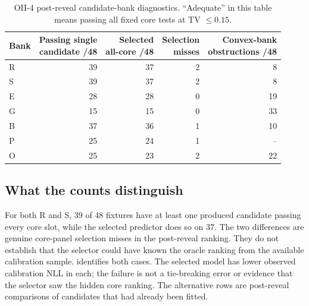 \begin{table}[tbp]
\centering
\caption{OII-4 post-reveal candidate-bank diagnostics. ``Adequate'' in this table means passing all fixed core tests at TV $\leq0.15$.}\label{tab:banks}
\small
\setlength{\tabcolsep}{5pt}
\begin{tabular}{lrrrr}
\toprule
Bank & \shortstack{Passing single\\candidate /48} & \shortstack{Selected\\all-core /48} & \shortstack{Selection\\misses} & \shortstack{Convex-bank\\obstructions /48} \\
\midrule
R & 39 & 37 & 2 & 8 \\
S & 39 & 37 & 2 & 8 \\
E & 28 & 28 & 0 & 19 \\
G & 15 & 15 & 0 & 33 \\
B & 37 & 36 & 1 & 10 \\
P & 25 & 24 & 1 & -- \\
O & 25 & 23 & 2 & 22 \\
\bottomrule
\end{tabular}
\par{}
\end{table}



\subsection{What the counts distinguish}\label{p3:c13}
For both R and S, 39 of 48 fixtures have at least one produced candidate passing every core slot, while the selected predictor does so on 37. The two differences are genuine core-panel selection misses in the post-reveal ranking. They do not establish that the selector could have known the oracle ranking from the available calibration sample.  identifies both cases. The selected model has lower observed calibration NLL in each; the failure is not a tie-breaking error or evidence that the selector saw the hidden core ranking. The alternative rows are post-reveal comparisons of candidates that had already been fitted.


